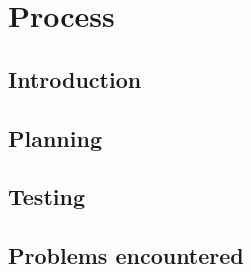\chapter{Process}

\section{Introduction}

\section{Planning}

\section{Testing}

\section{Problems encountered}

